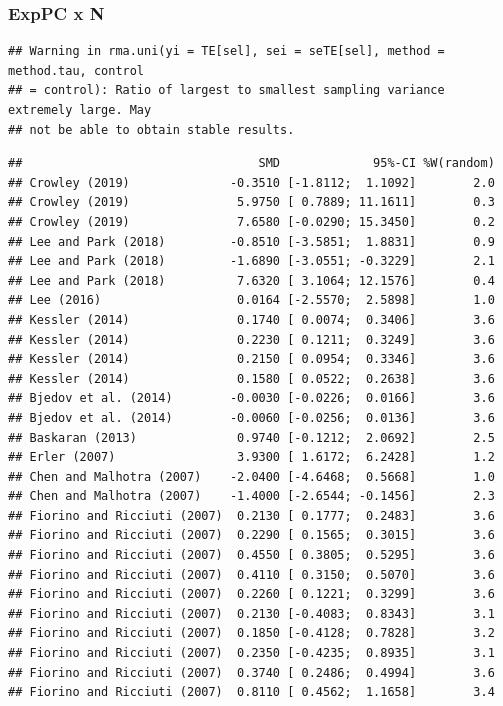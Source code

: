 \documentclass[
]{article}
\begin{document}
\hypertarget{exppc-x-n-1}{%
\subsubsection{ExpPC x N}\label{exppc-x-n-1}}

\begin{verbatim}
## Warning in rma.uni(yi = TE[sel], sei = seTE[sel], method = method.tau, control
## = control): Ratio of largest to smallest sampling variance extremely large. May
## not be able to obtain stable results.
\end{verbatim}

\begin{verbatim}
##                                 SMD             95%-CI %W(random)
## Crowley (2019)              -0.3510 [-1.8112;  1.1092]        2.0
## Crowley (2019)               5.9750 [ 0.7889; 11.1611]        0.3
## Crowley (2019)               7.6580 [-0.0290; 15.3450]        0.2
## Lee and Park (2018)         -0.8510 [-3.5851;  1.8831]        0.9
## Lee and Park (2018)         -1.6890 [-3.0551; -0.3229]        2.1
## Lee and Park (2018)          7.6320 [ 3.1064; 12.1576]        0.4
## Lee (2016)                   0.0164 [-2.5570;  2.5898]        1.0
## Kessler (2014)               0.1740 [ 0.0074;  0.3406]        3.6
## Kessler (2014)               0.2230 [ 0.1211;  0.3249]        3.6
## Kessler (2014)               0.2150 [ 0.0954;  0.3346]        3.6
## Kessler (2014)               0.1580 [ 0.0522;  0.2638]        3.6
## Bjedov et al. (2014)        -0.0030 [-0.0226;  0.0166]        3.6
## Bjedov et al. (2014)        -0.0060 [-0.0256;  0.0136]        3.6
## Baskaran (2013)              0.9740 [-0.1212;  2.0692]        2.5
## Erler (2007)                 3.9300 [ 1.6172;  6.2428]        1.2
## Chen and Malhotra (2007)    -2.0400 [-4.6468;  0.5668]        1.0
## Chen and Malhotra (2007)    -1.4000 [-2.6544; -0.1456]        2.3
## Fiorino and Ricciuti (2007)  0.2130 [ 0.1777;  0.2483]        3.6
## Fiorino and Ricciuti (2007)  0.2290 [ 0.1565;  0.3015]        3.6
## Fiorino and Ricciuti (2007)  0.4550 [ 0.3805;  0.5295]        3.6
## Fiorino and Ricciuti (2007)  0.4110 [ 0.3150;  0.5070]        3.6
## Fiorino and Ricciuti (2007)  0.2260 [ 0.1221;  0.3299]        3.6
## Fiorino and Ricciuti (2007)  0.2130 [-0.4083;  0.8343]        3.1
## Fiorino and Ricciuti (2007)  0.1850 [-0.4128;  0.7828]        3.2
## Fiorino and Ricciuti (2007)  0.2350 [-0.4235;  0.8935]        3.1
## Fiorino and Ricciuti (2007)  0.3740 [ 0.2486;  0.4994]        3.6
## Fiorino and Ricciuti (2007)  0.8110 [ 0.4562;  1.1658]        3.4

\end{verbatim}
\end{document}
